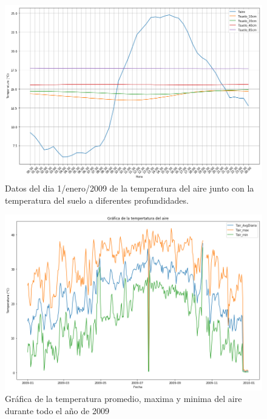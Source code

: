 \documentclass[12pt]{article}
\begin{document}
\begin{figure}
    \centering
    \includegraphics[scale = .4]{undia.png}
    \caption{Datos del dia 1/enero/2009 de la temperatura del aire junto con la temperatura del suelo a diferentes profundidades.}
    \label{fig:undia}
\end{figure}
\begin{figure}
    \centering
    \includegraphics[scale=.4]{aire.png}
    \caption{Gr\'afica de la temperatura promedio, maxima y minima del aire durante todo el año de 2009}
    \label{fig:aire}
\end{figure}
\end{document}
